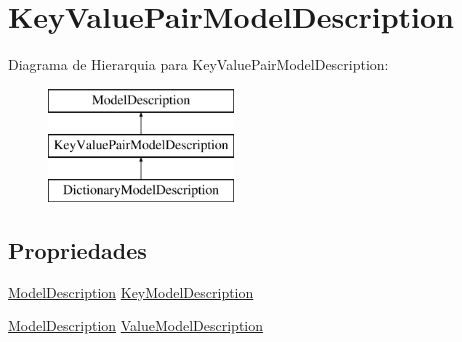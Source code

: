 \hypertarget{classApi3Layers_1_1Areas_1_1HelpPage_1_1ModelDescriptions_1_1KeyValuePairModelDescription}{}\section{Key\+Value\+Pair\+Model\+Description}
\label{classApi3Layers_1_1Areas_1_1HelpPage_1_1ModelDescriptions_1_1KeyValuePairModelDescription}
Diagrama de Hierarquia para Key\+Value\+Pair\+Model\+Description\+:\begin{figure}[H]
\begin{center}
\leavevmode
\includegraphics[height=3.000000cm]{dd/d36/classApi3Layers_1_1Areas_1_1HelpPage_1_1ModelDescriptions_1_1KeyValuePairModelDescription}
\end{center}
\end{figure}
\subsection*{Propriedades}
\begin{DoxyCompactItemize}
\item 
\hyperlink{classApi3Layers_1_1Areas_1_1HelpPage_1_1ModelDescriptions_1_1ModelDescription}{Model\+Description} \hyperlink{classApi3Layers_1_1Areas_1_1HelpPage_1_1ModelDescriptions_1_1KeyValuePairModelDescription_a007c899d0967cadd0ba3dd3401b835ea}{Key\+Model\+Description}
\item 
\hyperlink{classApi3Layers_1_1Areas_1_1HelpPage_1_1ModelDescriptions_1_1ModelDescription}{Model\+Description} \hyperlink{classApi3Layers_1_1Areas_1_1HelpPage_1_1ModelDescriptions_1_1KeyValuePairModelDescription_aa80f5630d332a9c35eea5c0f793574e5}{Value\+Model\+Description}
\end{DoxyCompactItemize}


